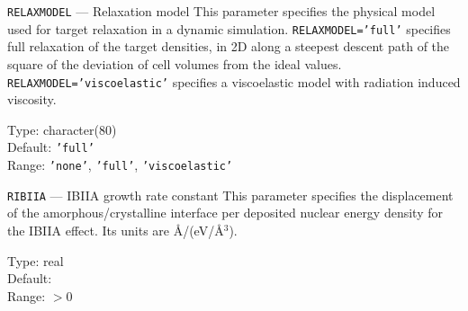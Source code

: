 \begin{keydescription}{\texttt{RELAXMODEL} --- Relaxation model}
%
  This parameter specifies the physical model used for target relaxation in a
  dynamic simulation. \texttt{RELAXMODEL='full'} specifies full relaxation
  of the target densities, in 2D along a steepest descent path of the square 
  of the deviation of cell volumes from the ideal values. 
  \texttt{RELAXMODEL='viscoelastic'} specifies a viscoelastic model with
  radiation induced viscosity.
  \begin{keytab}
    Type:    \> character(80) \\
    Default: \> \texttt{'full'} \\
    Range:   \> \texttt{'none'}, \texttt{'full'}, \texttt{'viscoelastic'}
  \end{keytab}
\end{keydescription}

\begin{keydescription}{\texttt{RIBIIA} --- IBIIA growth rate constant}
%
  This parameter specifies the displacement of the
  amorphous/crystalline interface per deposited nuclear energy
  density for the IBIIA effect. Its units are \AA /(eV/\AA $^3$).
  \begin{keytab}
    Type:    \> real \\
    Default:  \\
    Range:   \> $> 0$ 
  \end{keytab}
\end{keydescription}


